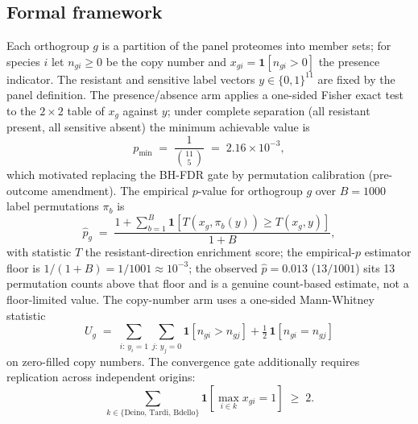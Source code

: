 \documentclass[12pt,a4paper]{article}
\begin{document}
\subsection{Formal framework}
Each orthogroup $g$ is a partition of the panel proteomes into member sets; for species $i$ let $n_{gi} \ge 0$ be the copy number and $x_{gi} = \mathbf{1}[n_{gi} > 0]$ the presence indicator. The resistant and sensitive label vectors $y \in \{0,1\}^{11}$ are fixed by the panel definition. The presence/absence arm applies a one-sided Fisher exact test to the $2\times2$ table of $x_g$ against $y$; under complete separation (all resistant present, all sensitive absent) the minimum achievable value is
\begin{equation}
p_{\min} \;=\; \frac{1}{\binom{11}{5}} \;=\; 2.16\times10^{-3},
\end{equation}
which motivated replacing the BH-FDR gate by permutation calibration (pre-outcome amendment). The empirical $p$-value for orthogroup $g$ over $B=1000$ label permutations $\pi_b$ is
\begin{equation}
\hat{p}_g \;=\; \frac{1 + \sum_{b=1}^{B} \mathbf{1}\!\left[ T(x_g, \pi_b(y)) \ge T(x_g, y) \right]}{1 + B},
\end{equation}
with statistic $T$ the resistant-direction enrichment score; the empirical-$p$ estimator floor is $1/(1+B) = 1/1001 \approx 10^{-3}$; the observed $\hat p = 0.013$ ($13/1001$) sits 13 permutation counts above that floor and is a genuine count-based estimate, not a floor-limited value. The copy-number arm uses a one-sided Mann-Whitney statistic
\begin{equation}
U_g \;=\; \sum_{i:\, y_i = 1} \sum_{j:\, y_j = 0} \mathbf{1}\!\left[ n_{gi} > n_{gj} \right] + \tfrac{1}{2}\,\mathbf{1}\!\left[ n_{gi} = n_{gj} \right]
\end{equation}
on zero-filled copy numbers. The convergence gate additionally requires replication across independent origins:
\begin{equation}
\sum_{k \in \{\text{Deino},\, \text{Tardi},\, \text{Bdello}\}} \mathbf{1}\!\left[ \max_{i \in k} x_{gi} = 1 \right] \;\ge\; 2.
\end{equation}
\end{document}
